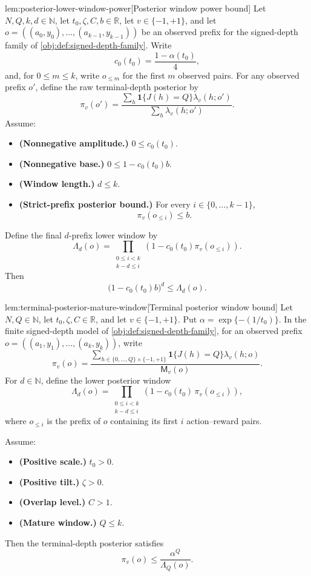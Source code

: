 \begin{lemmav}{lem:posterior-lower-window-power}[Posterior window power bound]
Let \(N,Q,k,d\in\mathbb N\), let \(t_0,\zeta,C,b\in\mathbb R\), let \(v\in\{-1,+1\}\), and let \(o=((a_0,y_0),\ldots,(a_{k-1},y_{k-1}))\) be an observed prefix for the signed-depth family of \cref{obj:def:signed-depth-family}.  Write
\[
c_0(t_0)=\frac{1-\alpha(t_0)}{4},
\]
and, for \(0\le m\le k\), write \(o_{\le m}\) for the first \(m\) observed pairs.  For any observed prefix \(o'\), define the raw terminal-depth posterior by
\[
\pi_v(o')
=
\frac{\sum_h \mathbf 1\{J(h)=Q\}\lambda_v(h;o')}
     {\sum_h \lambda_v(h;o')}.
\]
Assume:
\begin{itemize}
\item \textbf{(Nonnegative amplitude.)} \(0\le c_0(t_0)\).
\item \textbf{(Nonnegative base.)} \(0\le 1-c_0(t_0)b\).
\item \textbf{(Window length.)} \(d\le k\).
\item \textbf{(Strict-prefix posterior bound.)} For every \(i\in\{0,\ldots,k-1\}\),
\[
\pi_v(o_{\le i})\le b.
\]
\end{itemize}
Define the final \(d\)-prefix lower window by
\[
\Lambda_d(o)
=
\prod_{\substack{0\le i<k\\ k-d\le i}}
\left(1-c_0(t_0)\pi_v(o_{\le i})\right).
\]
Then
\[
\bigl(1-c_0(t_0)b\bigr)^d\le \Lambda_d(o).
\]
\end{lemmav}

\begin{lemmav}{lem:terminal-posterior-mature-window}[Terminal posterior window bound]
Let \(N,Q\in\mathbb N\), let \(t_0,\zeta,C\in\mathbb R\), and let \(v\in\{-1,+1\}\).  Put \(\alpha=\exp\{-(1/t_0)\}\).  In the finite signed-depth model of \cref{obj:def:signed-depth-family}, for an observed prefix \(o=((a_1,y_1),\ldots,(a_k,y_k))\), write
\[
\pi_v(o)
=
\frac{
\sum_{h\in\{0,\ldots,Q\}\times\{-1,+1\}}
\mathbf 1\{J(h)=Q\}\lambda_v(h;o)
}{
\mathsf M_v(o)
}.
\]
For \(d\in\mathbb N\), define the lower posterior window
\[
\Lambda_d(o)
=
\prod_{\substack{0\le i<k\\ k-d\le i}}
\left(1-c_0(t_0)\,\pi_v(o_{\le i})\right),
\]
where \(o_{\le i}\) is the prefix of \(o\) containing its first \(i\) action--reward pairs.

Assume:
\begin{itemize}
\item \textbf{(Positive scale.)} \(t_0>0\).
\item \textbf{(Positive tilt.)} \(\zeta>0\).
\item \textbf{(Overlap level.)} \(C>1\).
\item \textbf{(Mature window.)} \(Q\le k\).
\end{itemize}
Then the terminal-depth posterior satisfies
\[
\pi_v(o)
\le
\frac{\alpha^Q}{\Lambda_Q(o)}.
\]
\end{lemmav}

